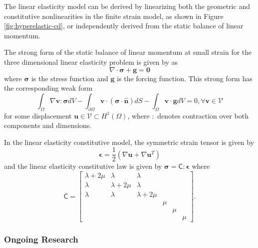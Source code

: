 The linear elasticity model can be derived by linearizing both the geometric and constitutive nonlinearities in the finite strain model, as shown in Figure \ref{fig:hyperelastic-cd}, or independently derived from the static balance of linear momentum.

The strong form of the static balance of linear momentum at small strain for the three dimensional linear elasticity problem is given by \cite{hughes2012finite} as
\begin{equation}
\nabla \cdot \boldsymbol{\sigma} + \boldsymbol{g} = \boldsymbol{0}
\end{equation}
where $\boldsymbol{\sigma}$ is the stress function and $\boldsymbol{g}$ is the forcing function.
This strong form has the corresponding weak form
\begin{equation}
\int_{\Omega} \nabla \mathbf{v} : \boldsymbol{\sigma} dV - \int_{\partial \Omega} \mathbf{v} \cdot \left( \boldsymbol{\sigma} \cdot \hat{\mathbf{n}} \right) dS - \int_{\Omega} \mathbf{v} \cdot \mathbf{g} dV = 0, \forall \mathbf{v} \in \mathcal{V}
\end{equation}
for some displacement $\mathbf{u} \in \mathcal{V} \subset H^1 \left( \Omega \right)$, where $:$ denotes contraction over both components and dimensions.

In the linear elasticity constitutive model, the symmetric strain tensor is given by
\begin{equation}
\boldsymbol{\epsilon} = \frac{1}{2} \left( \nabla \mathbf{u} + \nabla \mathbf{u}^T \right)
\end{equation}
and the linear elasticity constitutive law is given by $\boldsymbol{\sigma} = \mathsf{C} : \boldsymbol{\epsilon}$ where
\begin{equation}
\mathsf{C} =
\begin{bmatrix}
   \lambda + 2\mu & \lambda & \lambda & & & \\
   \lambda & \lambda + 2\mu & \lambda & & & \\
   \lambda & \lambda & \lambda + 2\mu & & & \\
   & & & \mu & & \\
   & & & & \mu & \\
   & & & & & \mu
\end{bmatrix}.
\end{equation}

\subsubsection{Ongoing Research}

